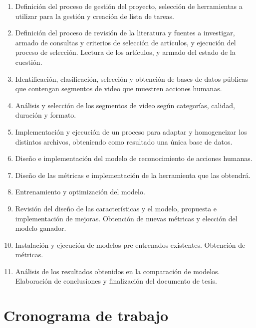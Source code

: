 \documentclass[10pt]{article}
\begin{document}
\begin{enumerate}
	
	\item Definición del proceso de gestión del proyecto, selección de herramientas a utilizar para la gestión y creación de lista de tareas.
	
	\item Definición del proceso de revisión de la literatura y fuentes a investigar, armado de consultas y criterios de selección de artículos, y ejecución del proceso de selección. Lectura de los artículos, y armado del estado de la cuestión.
	
	\item Identificación, clasificación, selección y obtención de bases de datos públicas que contengan segmentos de video que muestren acciones humanas.
	
	\item Análisis y selección de los segmentos de video según categorías, calidad, duración y formato.
	
	\item Implementación y ejecución de un proceso para adaptar y homogeneizar los distintos archivos, obteniendo como resultado una única base de datos.
	
	\item Diseño e implementación del modelo de reconocimiento de acciones humanas.
	
	\item Diseño de las métricas e implementación de la herramienta que las obtendrá.
	
	\item Entrenamiento y optimización del modelo.
	
	\item Revisión del diseño de las características y el modelo, propuesta e implementación de mejoras. Obtención de nuevas métricas y elección del modelo ganador.
	
	\item Instalación y ejecución de modelos pre-entrenados existentes. Obtención de métricas.
	
	\item Análisis de los resultados obtenidos en la comparación de modelos.  Elaboración de conclusiones y finalización del documento de tesis.
	
\end{enumerate}

\pagebreak

\section{Cronograma de trabajo}
\end{document}
